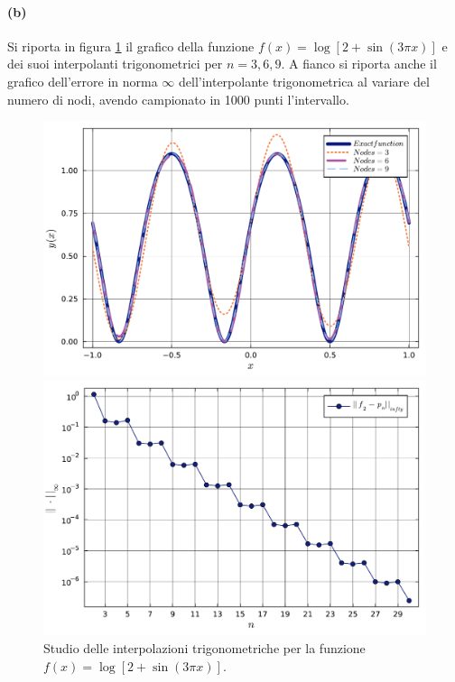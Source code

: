 \documentclass[letterpaper, 12pt]{article}
\begin{document}
\paragraph{(b) } Si riporta in figura \ref{fig:es4_6_1_2} il grafico della funzione $f(x) = \log [2+ \sin (3 \pi x ) ]$
e dei suoi interpolanti trigonometrici per $n=3,6,9$. A fianco si riporta anche il grafico
dell'errore in norma $\infty$ dell'interpolante trigonometrica al variare del numero di nodi, avendo campionato
in 1000 punti l'intervallo.
\begin{figure}[!ht]
    \centering
    \begin{minipage}[b]{0.47\textwidth}
        \includegraphics[width=\textwidth]{4613.pdf}
    \end{minipage}
    \hspace{0.5cm}
    \begin{minipage}[b]{0.47\textwidth}
        \includegraphics[width=\textwidth]{4614.pdf}
    \end{minipage}
    \caption{Studio delle interpolazioni trigonometriche per la funzione $f(x) = \log [2+ \sin (3 \pi x ) ]$.}
    \label{fig:es4_6_1_2}
\end{figure}
\end{document}
